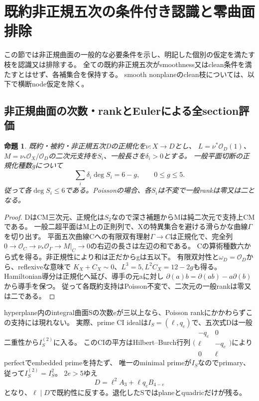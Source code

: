 \documentclass[a4paper,11pt]{ltjsarticle}
\newtheorem{proposition}{命題}[section]
\theoremstyle{definition}
\begin{document}
\section{既約非正規五次の条件付き認識と零曲面排除}
この節では非正規曲面の一般的な必要条件を示し、明記した個別の仮定を満たす枝を認識又は排除する。
全ての既約非正規五次がsmoothness又はclean条件を満たすとはせず、各補集合を保持する。
smooth nonplaneのclean枝については、以下で横断node仮定を除く。

\subsection{非正規曲面の次数・rankとEulerによる全section評価}
\begin{proposition}\label{prop:nonnormal-surface-degree}
既約・被約・非正規五次Dの正規化を$\nu:X\to D$とし、
$L=\nu^*\mathcal O_D(1)$、$M=\nu_*\mathcal O_X/\mathcal O_D$の二次元支持を$S_i$、一般長さを$\delta_i>0$とする。
一般平面切断の正規化種数gについて
\[
 \sum_i\delta_i\deg S_i=6-g,\qquad0\le g\le5.
\]
従って各$\deg S_i\le6$である。Poissonの場合、各$S_i$は不変で一般rankは零又は二となる。
\end{proposition}
\begin{proof}
DはCM三次元、正規化は$S_2$なので深さ補題からMは純二次元で支持上CMである。
一般二超平面はM上の正則列で、Xの特異集合を避ける滑らかな曲線$\Gamma$を切り出す。
平面五次曲線Cへの有限双有理射$\Gamma\to C$は正規化で、完全列
$0\to\mathcal O_C\to\nu_*\mathcal O_\Gamma\to M|_C\to0$の右辺の長さは左辺の和である。
Cの算術種数六から式を得る。非正規性により和は正だからgは五以下。
有限双対性と$\omega_D=\mathcal O_D$から、reflexiveな意味で
$K_X+C_X\sim0$、$L^3=5,L^2C_X=12-2g$も得る。
Hamiltonian導分は正規化へ延び、導手の元aに対し
$\partial(a)b=\partial(ab)-a\partial(b)$から導手を保つ。
従って各既約支持はPoisson不変で、二次元の一般rankは零又は二である。
\end{proof}

hyperplane内のintegral曲面Sの次数eが三以上なら、Poisson rankにかかわらずこの支持には現れない。
実際、prime CI idealは$I_S=(\ell,q_e)$で、五次式Dは一般二重性から$I_S^{(2)}$に入る。
このCIの平方はHilbert--Burch行列
$\bigl(\begin{smallmatrix}-q_e&0\\\ell&-q_e\\0&\ell\end{smallmatrix}\bigr)$によりperfectでembedded primeを持たず、
唯一のminimal primeが$I_S$なのでprimary、従って$I_S^{(2)}=I_S^2$。
$2e>5$ゆえ
\[
 D=\ell^2A_3+\ell q_eB_{4-e}
\]
となり、$\ell\mid D$で既約性に反する。退化したSではplaneとquadricだけが残る。
\end{document}
